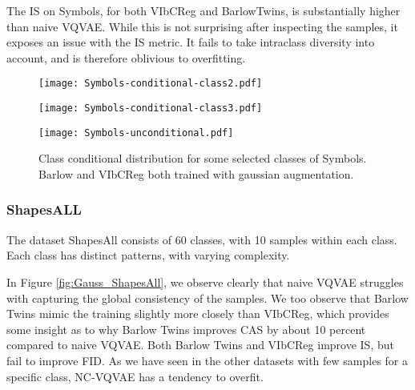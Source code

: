 \documentclass[../../thesis.tex]{subfiles}
\begin{document}
The IS on Symbols, for both VIbCReg and BarlowTwins, is substantially higher than naive VQVAE. While this is not surprising after inspecting the samples, it exposes an issue with the IS metric. It fails to take intraclass diversity into account, and is therefore oblivious to overfitting. \newline

\begin{figure}[H]
    \centering
    \begin{minipage}[b]{0.32\textwidth}
        \centering
        \texttt{[image: Symbols-conditional-class2.pdf]}
    \end{minipage}
    \begin{minipage}[b]{0.32\textwidth}
        \centering
        \texttt{[image: Symbols-conditional-class3.pdf]}
    \end{minipage}
    \begin{minipage}[b]{0.32\textwidth}
        \centering
        \texttt{[image: Symbols-unconditional.pdf]}
    \end{minipage}
    \caption{Class conditional distribution for some selected classes of Symbols. Barlow and VIbCReg both trained with gaussian augmentation.}
    \label{fig:Gauss_Symbols}
\end{figure}






\subsubsection{ShapesALL}
The dataset ShapesAll consists of 60 classes, with 10 samples within each class. Each class has distinct patterns, with varying complexity.\newline

In Figure \ref{fig:Gauss_ShapesAll}, we observe clearly that naive VQVAE struggles with capturing the global consistency of the samples. We too observe that Barlow Twins mimic the training slightly more closely than VIbCReg, which provides some insight as to why Barlow Twins improves CAS by about 10 percent compared to naive VQVAE. Both Barlow Twins and VIbCReg improve IS, but fail to improve FID. As we have seen in the other datasets with few samples for a specific class, NC-VQVAE has a tendency to overfit.
\end{document}
